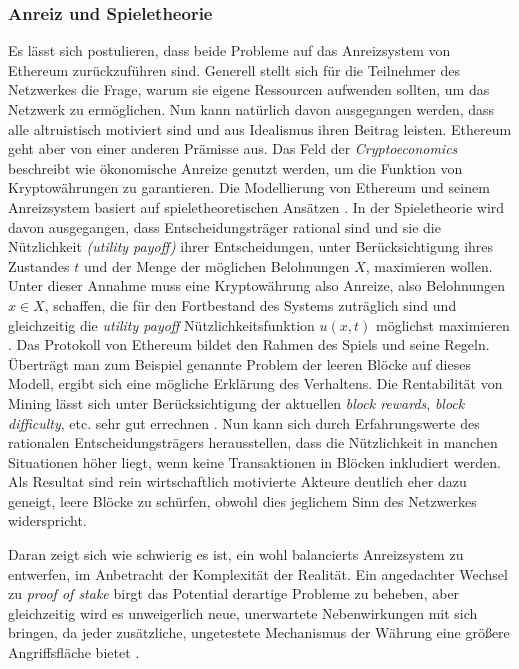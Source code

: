 \documentclass[runningheads]{llncs}
\begin{document}
\subsubsection{Anreiz und Spieletheorie}
Es lässt sich postulieren, dass beide Probleme auf das Anreizsystem von Ethereum zurückzuführen sind. Generell stellt sich für die Teilnehmer des Netzwerkes die Frage, warum sie eigene Ressourcen aufwenden sollten, um das Netzwerk zu ermöglichen. Nun kann natürlich davon ausgegangen werden, dass alle altruistisch motiviert sind und aus Idealismus ihren Beitrag leisten. Ethereum geht aber von einer anderen Prämisse aus. Das Feld der \textit{Cryptoeconomics} beschreibt wie ökonomische Anreize genutzt werden, um die Funktion von Kryptowährungen zu garantieren. Die Modellierung von Ethereum und seinem Anreizsystem basiert auf spieletheoretischen Ansätzen \cite{noauthor_cryptoeconomics_nodate}.
In der Spieletheorie wird davon ausgegangen, dass Entscheidungsträger rational sind und sie die Nützlichkeit \textit{(utility payoff)} ihrer Entscheidungen, unter Berücksichtigung ihres Zustandes $ t $ und der Menge der möglichen Belohnungen $ X $,  maximieren wollen. Unter dieser Annahme muss eine Kryptowährung also Anreize, also Belohnungen $ x \in X $, schaffen, die für den Fortbestand des Systems zuträglich sind und gleichzeitig die \textit{utility payoff} Nützlichkeitsfunktion $ u(x, t) $ möglichst maximieren \cite[S. 2 ff.]{myerson_game_1997}.
Das Protokoll von Ethereum bildet den Rahmen des Spiels und seine Regeln. Überträgt man zum Beispiel genannte Problem der leeren Blöcke auf dieses Modell, ergibt sich eine mögliche Erklärung des Verhaltens. Die Rentabilität von Mining lässt sich unter Berücksichtigung der aktuellen \textit{block rewards}, \textit{block difficulty}, etc. sehr gut errechnen \cite{noauthor_ethereum_nodate}. Nun kann sich durch Erfahrungswerte des rationalen Entscheidungsträgers herausstellen, dass die Nützlichkeit in manchen Situationen höher liegt, wenn keine Transaktionen in Blöcken inkludiert werden. Als Resultat sind rein wirtschaftlich motivierte Akteure deutlich eher dazu geneigt, leere Blöcke zu schürfen, obwohl dies jeglichem Sinn des Netzwerkes widerspricht.

Daran zeigt sich wie schwierig es ist, ein wohl balancierts Anreizsystem zu entwerfen, im Anbetracht der Komplexität der Realität. Ein angedachter Wechsel zu \textit{proof of stake} birgt das Potential derartige Probleme zu beheben, aber gleichzeitig wird es unweigerlich neue, unerwartete Nebenwirkungen mit sich bringen, da jeder zusätzliche, ungetestete Mechanismus der Währung eine größere Angriffsfläche bietet \cite{noauthor_ethereum/wiki_pos_nodate}.
\end{document}
